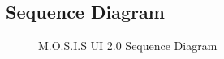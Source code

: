 \subsection{Sequence Diagram}
\begin{figure}[ht!]
	\caption{M.O.S.I.S UI 2.0 Sequence Diagram}
\end{figure}